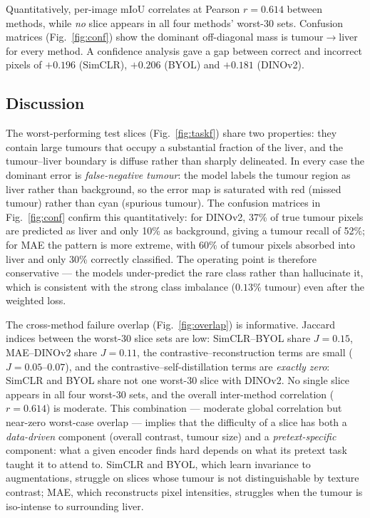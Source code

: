 \documentclass[conference]{IEEEtran}
\begin{document}
Quantitatively, per-image mIoU correlates at Pearson $r=0.614$ between methods,
while \emph{no} slice appears in all four methods' worst-30 sets. Confusion
matrices (Fig.~\ref{fig:conf}) show the dominant off-diagonal mass is
tumour$\rightarrow$liver for every method. A confidence analysis gave a gap
between correct and incorrect pixels of $+0.196$ (SimCLR), $+0.206$ (BYOL) and
$+0.181$ (DINOv2).

\subsection{Discussion}
The worst-performing test slices (Fig.~\ref{fig:taskf}) share two properties:
they contain large tumours that occupy a substantial fraction of the liver, and
the tumour--liver boundary is diffuse rather than sharply delineated. In every
case the dominant error is \emph{false-negative tumour}: the model labels the
tumour region as liver rather than background, so the error map is saturated
with red (missed tumour) rather than cyan (spurious tumour). The confusion
matrices in Fig.~\ref{fig:conf} confirm this quantitatively: for DINOv2, 37\%
of true tumour pixels are predicted as liver and only 10\% as background,
giving a tumour recall of 52\%; for MAE the pattern is more extreme, with 60\%
of tumour pixels absorbed into liver and only 30\% correctly classified. The
operating point is therefore conservative --- the models under-predict the
rare class rather than hallucinate it, which is consistent with the strong
class imbalance ($0.13\%$ tumour) even after the weighted loss.

The cross-method failure overlap (Fig.~\ref{fig:overlap}) is informative.
Jaccard indices between the worst-30 slice sets are low: SimCLR--BYOL share
$J=0.15$, MAE--DINOv2 share $J=0.11$, the contrastive--reconstruction terms are
small ($J=0.05$--$0.07$), and the contrastive--self-distillation terms are
\emph{exactly zero}: SimCLR and BYOL share not one worst-30 slice with DINOv2.
No single slice appears in all four worst-30 sets, and the overall inter-method
correlation ($r=0.614$) is moderate. This combination --- moderate global
correlation but near-zero worst-case overlap --- implies that the difficulty
of a slice has both a \emph{data-driven} component (overall contrast, tumour
size) and a \emph{pretext-specific} component: what a given encoder finds hard
depends on what its pretext task taught it to attend to. SimCLR and BYOL, which
learn invariance to augmentations, struggle on slices whose tumour is not
distinguishable by texture contrast; MAE, which reconstructs pixel intensities,
struggles when the tumour is iso-intense to surrounding liver.
\end{document}

